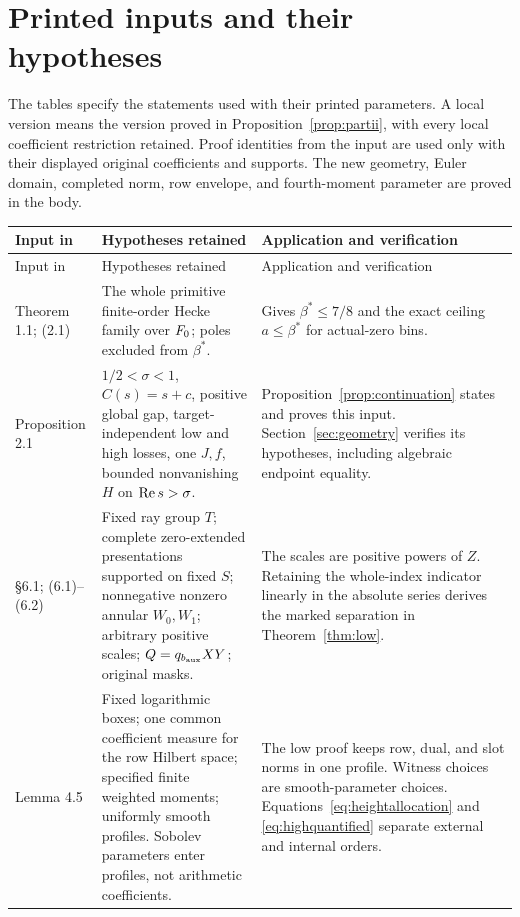 \section{Printed inputs and their hypotheses}\label{app:inputs}
The tables specify the statements used with their printed parameters. A local version means the version proved in Proposition~\ref{prop:partii}, with every local coefficient restriction retained. Proof identities from the input are used only with their displayed original coefficients and supports. The new geometry, Euler domain, completed norm, row envelope, and fourth-moment parameter are proved in the body.

\small
\begin{longtable}{@{}>{\raggedright\arraybackslash}p{}>{\raggedright\arraybackslash}p{}>{\raggedright\arraybackslash}p{}@{}}
\toprule
Input in \cite{openai2026q}&Hypotheses retained&Application and verification\\
\midrule
\endfirsthead
\toprule
Input in \cite{openai2026q}&Hypotheses retained&Application and verification\\
\midrule
\endhead
\bottomrule
\endfoot
Theorem 1.1; (2.1)&The whole primitive finite-order Hecke family over ${F_0}$; poles excluded from $\beta^*$.&Gives $\beta^*\le7/8$ and the exact ceiling $a\le\beta^*$ for actual-zero bins.\\
Proposition 2.1&$1/2<\sigma<1$, $C(s)=s+c$, positive global gap, target-independent low and high losses, one $J,f$, bounded nonvanishing $H$ on $\operatorname{Re} s>\sigma$.&Proposition~\ref{prop:continuation} states and proves this input. Section~\ref{sec:geometry} verifies its hypotheses, including algebraic endpoint equality.\\
\S6.1; (6.1)--(6.2)&Fixed ray group $T$; complete zero-extended presentations supported on fixed $S$; nonnegative nonzero annular $W_0,W_1$; arbitrary positive scales; $Q=q_{b_{\rm aux}}XY$; original masks.&The scales are positive powers of $Z$. Retaining the whole-index indicator linearly in the absolute series derives the marked separation in Theorem~\ref{thm:low}.\\
Lemma 4.5&Fixed logarithmic boxes; one common coefficient measure for the row Hilbert space; specified finite weighted moments; uniformly smooth profiles. Sobolev parameters enter profiles, not arithmetic coefficients.&The low proof keeps row, dual, and slot norms in one profile. Witness choices are smooth-parameter choices. Equations~\eqref{eq:heightallocation} and \eqref{eq:highquantified} separate external and internal orders.\\

\end{longtable}

